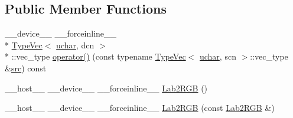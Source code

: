 \subsection*{Public Member Functions}
\begin{DoxyCompactItemize}
\item 
\-\_\-\-\_\-device\-\_\-\-\_\- \-\_\-\-\_\-forceinline\-\_\-\-\_\- \\*
\hyperlink{structcv_1_1gpu_1_1device_1_1TypeVec}{Type\-Vec}$<$ \hyperlink{core_2types__c_8h_a65f85814a8290f9797005d3b28e7e5fc}{uchar}, dcn $>$\\*
\-::vec\-\_\-type \hyperlink{structcv_1_1gpu_1_1device_1_1color__detail_1_1Lab2RGB_3_01uchar_00_01scn_00_01dcn_00_01srgb_00_01blueIdx_01_4_a5387feb838d1b77fe8dbd42086410550}{operator()} (const typename \hyperlink{structcv_1_1gpu_1_1device_1_1TypeVec}{Type\-Vec}$<$ \hyperlink{core_2types__c_8h_a65f85814a8290f9797005d3b28e7e5fc}{uchar}, scn $>$\-::vec\-\_\-type \&\hyperlink{legacy_8hpp_a371cd109b74033bc4366f584edd3dacc}{src}) const 
\item 
\-\_\-\-\_\-host\-\_\-\-\_\- \-\_\-\-\_\-device\-\_\-\-\_\- \-\_\-\-\_\-forceinline\-\_\-\-\_\- \hyperlink{structcv_1_1gpu_1_1device_1_1color__detail_1_1Lab2RGB_3_01uchar_00_01scn_00_01dcn_00_01srgb_00_01blueIdx_01_4_ae1ee76c75e420caf07e7dc28b848c047}{Lab2\-R\-G\-B} ()
\item 
\-\_\-\-\_\-host\-\_\-\-\_\- \-\_\-\-\_\-device\-\_\-\-\_\- \-\_\-\-\_\-forceinline\-\_\-\-\_\- \hyperlink{structcv_1_1gpu_1_1device_1_1color__detail_1_1Lab2RGB_3_01uchar_00_01scn_00_01dcn_00_01srgb_00_01blueIdx_01_4_a8df9e6ebc999f08b6c89566dd292168d}{Lab2\-R\-G\-B} (const \hyperlink{structcv_1_1gpu_1_1device_1_1color__detail_1_1Lab2RGB}{Lab2\-R\-G\-B} \&)
\end{DoxyCompactItemize}


